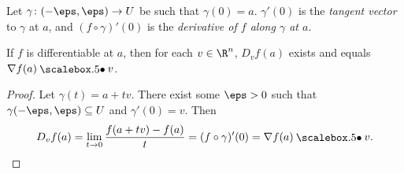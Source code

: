 \begin{definition}
    Let $\gamma\colon (-\eps, \eps) \to U$ be such that $\gamma(0) = a$.
    $\gamma'(0)$ is the \emph{tangent vector} to $\gamma$ at $a$,
    and $(f \circ \gamma)'(0)$ is the
    \emph{derivative of $f$ along $\gamma$ at $a$}.
\end{definition}

\begin{proposition}
    If $f$ is differentiable at $a$, then for each $v \in \R^n$,
    $D_v f(a)$ exists and equals $\grad f(a) \dotp v$.
\end{proposition}
\begin{proof}
    Let $\gamma(t) = a + tv$.
    There exist some $\eps > 0$ such that $\gamma(-\eps, \eps) \subseteq U$
    and $\gamma'(0) = v$.
    Then \[
        D_v f(a) = \lim_{t \to 0} \frac{f(a + tv) - f(a)}{t}
        = (f \circ \gamma)'(0) = \grad f(a) \dotp v. \qedhere
    \]
\end{proof}
